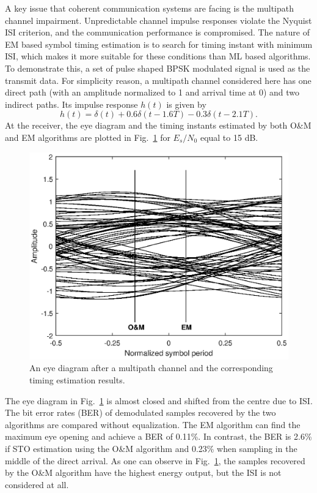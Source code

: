 \documentclass[12pt, draftclsnofoot, onecolumn]{IEEEtran}
\begin{document}
A key issue that coherent communication systems are facing is the multipath channel impairment.
Unpredictable channel impulse responses violate the Nyquist ISI criterion, and the communication performance is compromised.
The nature of EM based symbol timing estimation is to search for timing instant with minimum ISI, which makes it more suitable for these conditions than ML based algorithms.
To demonstrate this, a set of pulse shaped BPSK modulated signal is used as the transmit data.
For simplicity reason, a multipath channel considered here has one direct path (with an amplitude normalized to 1 and arrival time at 0) and two indirect paths.
Its impulse response $h(t)$ is given by
\begin{equation}
h(t)=\delta(t)+0.6\delta(t-1.6T)-0.3\delta(t-2.1T).
\label{eq:multi_path}
\end{equation}
At the receiver, the eye diagram and the timing instants estimated by both O\&M and EM algorithms are plotted in Fig.~\ref{fig:per_timing_isi} for \(E_s/N_0\) equal to 15 dB. 
\begin{figure}[ht]
\centering
\includegraphics[width=3.1 in]{pic/per_timing_multi-k.eps}
\caption{An eye diagram after a multipath channel and the corresponding timing estimation results.}
\label{fig:per_timing_isi} 
\end{figure} 

The eye diagram in Fig.~\ref{fig:per_timing_isi} is almost closed and shifted from the centre due to ISI.
The bit error rates (BER) of demodulated samples recovered by the two algorithms are compared without equalization.
The EM algorithm can find the maximum eye opening and achieve a BER of 0.11\%.
In contrast, the BER is 2.6\% if STO estimation using the O\&M algorithm and 0.23\% when sampling in the middle of the direct arrival.
As one can observe in Fig.~\ref{fig:per_timing_isi}, the samples recovered by the O\&M algorithm have the highest energy output, but the ISI is not considered at all.
\end{document}
